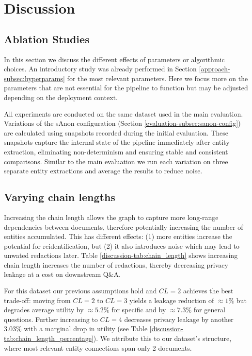 \section{Discussion}\label{sec:discussion}
\subsection{Ablation Studies}
In this section we discuss the different effects of parameters or algorithmic choices. An introductory study was already performed in Section \ref{approach-subsec:hyperparams} for the most relevant parameters. Here we focus more on the parameters that are not essential for the pipeline to function  but may be adjusted depending on the deployment context.  

All experiments are conducted on the same dataset used in the main evaluation. Variations of the sAnon configuration (Section \ref{evaluation-subsec:sanon-config}) are calculated using snapshots recorded during the initial evaluation. These snapshots capture the internal state of the pipeline immediately after entity extraction, eliminating non-determinism and ensuring stable and consistent comparisons.  Similar to the main evaluation we run each variation on three separate entity extractions and average the results to reduce noise.


\subsection{Varying chain lengths}
Increasing the chain length allows the graph to capture more long-range dependencies between documents, therefore potentially increasing the number of entities accumulated. This has different effects: (1) more entities increase the potential for reidentification, but (2) it also introduces noise which may lead to unwated redactions later. Table \ref{discussion-tab:chain_length} shows increasing chain length increases the number of redactions, thereby decreasing privacy leakage at a cost on downstream Q\&A. 

For this dataset our previous assumptions hold and $CL = 2$ achieves the best trade-off: moving from $CL=2$ to $CL=3$ yields a leakage reduction of $\approx 1\%$ but degrades average utility by $\approx 5.2\%$ for specific and by $\approx 7.3\%$ for general questions. Further increasing to $CL=4$ decreases privacy leakage by another $3.03\%$ with a marginal drop in utility (see Table \ref{discussion-tab:chain_length_percentage}).  We attribute this to our dataset's structure, where most relevant entity connections span only 2 documents.

